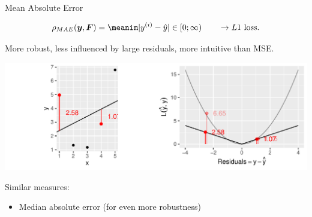 
\begin{vbframe}{Mean Absolute Error}

$$ 
\rho_{MAE}(\yv, \F) = \meanim \rvert \yi - \yih \rvert \in [0;\infty) \qquad \rightarrow L1 
\text{ loss}.
$$

\begin{minipage}[c]{0.33\textwidth}
  \raggedright
  \small
  More robust, less influenced by large residuals, more intuitive than MSE.
\end{minipage}%
\begin{minipage}[c]{0.67\textwidth}
  \begin{knitrout}\scriptsize
  \color{fgcolor}
  {\includegraphics[width=\textwidth]{figure/plot_abs_loss}}
\end{knitrout}
\end{minipage}

\small
Similar measures:

\begin{itemize}
  \small
  \item Median absolute error (for even more robustness)
\end{itemize}

\end{vbframe}


